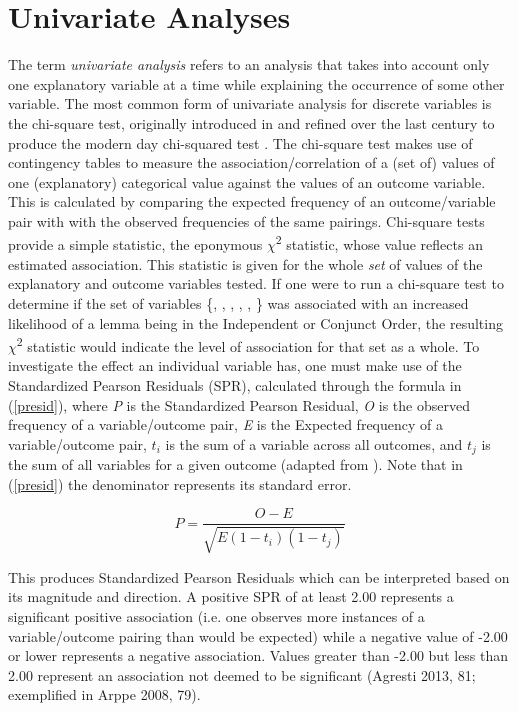 \section{Univariate Analyses}
The term \textit{univariate analysis} refers to an analysis that takes into account only one explanatory variable at a time while explaining the occurrence of some other variable.  The most common form of univariate analysis for discrete variables is the chi-square test, originally introduced in \citet{pearson1900x} and refined over the last century to produce the modern day chi-squared test \citep{agresti2013categorical}. The chi-square test makes use of contingency tables to measure the association/correlation of a (set of) values of one (explanatory) categorical value against the values of an outcome variable. This is calculated by comparing the expected frequency of an outcome/variable pair with with the observed frequencies of the same pairings. Chi-square tests provide a simple statistic, the eponymous $\chi$\textsuperscript{2} statistic, whose value reflects an estimated association. This statistic is given for the whole \textit{set} of values of the explanatory and outcome variables tested. If one were to run a chi-square test to determine if the set of variables \{, , , , , \} was associated with an increased likelihood of a lemma being in the Independent or Conjunct Order, the resulting $\chi$\textsuperscript{2} statistic would indicate the level of association for that set as a whole. To investigate the effect an individual variable has, one must make use of the Standardized Pearson Residuals (SPR), calculated through the formula in (\ref{presid}), where \textit{P} is the Standardized Pearson Residual, \textit{O} is the observed frequency of a variable/outcome pair, \textit{E} is the Expected frequency of a variable/outcome pair, $t_{i}$ is the sum of a variable across all outcomes, and $t_{j}$ is the sum of all variables for a given outcome  (adapted from \citep[81]{agresti2013categorical}). Note that in (\ref{presid}) the denominator represents its standard error.

\begin{equation}
P = \frac{O - E}{\sqrt{E(1-t_{i})(1-t_{j})}}
\label{presid}
\end{equation}

This produces Standardized Pearson Residuals which can be interpreted based on its magnitude and direction. A positive SPR of at least 2.00 represents a significant positive association (i.e. one observes more instances of a variable/outcome pairing than would be expected) while a negative value of -2.00 or lower represents a negative association. Values greater than -2.00 but less than 2.00 represent an association not deemed to be significant (Agresti 2013, 81; exemplified in Arppe 2008, 79). 

